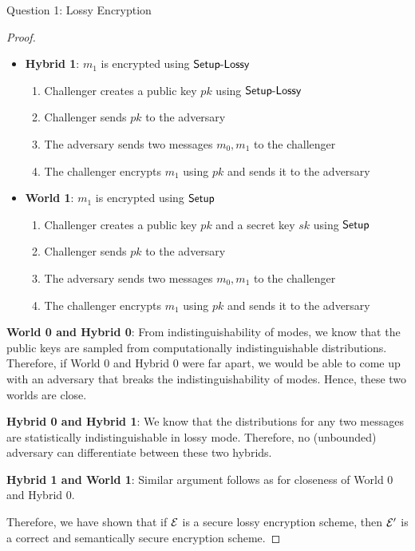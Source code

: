 \begin{solution}{Question 1: Lossy Encryption}
\begin{proof}
\begin{itemize}
        \item \textbf{Hybrid 1}: $m_1$ is encrypted using $\mathsf{Setup\text{-}Lossy}$
        \begin{enumerate}
            \item Challenger creates a public key $pk$ using $\mathsf{Setup\text{-}Lossy}$
            \item Challenger sends $pk$ to the adversary
            \item The adversary sends two messages $m_0, m_1$ to the challenger
            \item The challenger encrypts $m_1$ using $pk$ and sends it to the adversary
        \end{enumerate}

        \item \textbf{World 1}: $m_1$ is encrypted using $\mathsf{Setup}$
        \begin{enumerate}
            \item Challenger creates a public key $pk$ and a secret key $sk$ using $\mathsf{Setup}$
            \item Challenger sends $pk$ to the adversary
            \item The adversary sends two messages $m_0, m_1$ to the challenger
            \item The challenger encrypts $m_1$ using $pk$ and sends it to the adversary
        \end{enumerate}
    \end{itemize}

    \textbf{World 0 and Hybrid 0}: From indistinguishability of modes, we know that the public keys are sampled from computationally indistinguishable distributions. Therefore, if World 0 and Hybrid 0 were far apart, we would be able to come up with an adversary that breaks the indistinguishability of modes. Hence, these two worlds are close.\par
    \textbf{Hybrid 0 and Hybrid 1}: We know that the distributions for any two messages are statistically indistinguishable in lossy mode. Therefore, no (unbounded) adversary can differentiate between these two hybrids.\par
    \textbf{Hybrid 1 and World 1}: Similar argument follows as for closeness of World 0 and Hybrid 0.\par

    Therefore, we have shown that if $\mathcal{E}$ is a secure lossy encryption scheme, then $\mathcal{E}'$ is a correct and semantically secure encryption scheme.
    \end{proof}
\end{solution}
